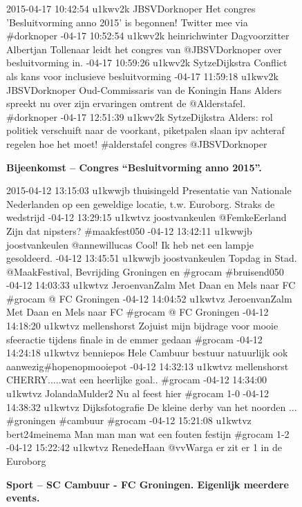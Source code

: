{{\vspace*{-17pt} 
\begin{figure}[H]
 \caption{\bf{Bijeenkomst} – Congres ``Besluitvorming anno 2015''.}
\vspace*{-10pt} 
\begin{framed}
\footnotesize{
2015-04-17 10:42:54 u1kwv2k JBSVDorknoper Het congres 'Besluitvorming anno 2015' is begonnen! Twitter mee via \#dorknoper
-04-17 10:52:54 u1kwv2k heinrichwinter Dagvoorzitter Albertjan Tollenaar leidt het congres van @JBSVDorknoper over besluitvorming in.
-04-17 10:59:26 u1kwv2k SytzeDijkstra Conflict als kans voor inclusieve besluitvorming
-04-17 11:59:18 u1kwv2k JBSVDorknoper Oud-Commissaris van de Koningin Hans Alders spreekt nu over zijn ervaringen omtrent de @Alderstafel. \#dorknoper
-04-17 12:51:39 u1kwv2k SytzeDijkstra Alders: rol politiek verschuift naar de voorkant, piketpalen slaan ipv achteraf regelen hoe het moet! \#alderstafel congres @JBSVDorknoper}
\end{framed}
\end{figure}

\vspace*{-17pt} 
\begin{figure}[H]
 \caption{\bf{Sport} – SC Cambuur - FC Groningen. Eigenlijk meerdere events.}
\vspace*{-10pt} 
\begin{framed}
\footnotesize{
2015-04-12 13:15:03 u1kwwjb thuisingeld Presentatie van Nationale Nederlanden op een geweldige locatie, t.w. Euroborg. Straks de wedstrijd
-04-12 13:29:15 u1kwtvz joostvankeulen @FemkeEerland Zijn dat nipsters? \#maakfest050
-04-12 13:42:11 u1kwwjb joostvankeulen @annewillucas Cool! Ik heb net een lampje gesoldeerd.
-04-12 13:45:51 u1kwwjb joostvankeulen Topdag in Stad. @MaakFestival, Bevrijding Groningen en \#grocam \#bruisend050
-04-12 14:03:33 u1kwtvz JeroenvanZalm Met Daan en Mels naar FC \#grocam @ FC Groningen
-04-12 14:04:52 u1kwtvz JeroenvanZalm Met Daan en Mels naar FC \#grocam @ FC Groningen
-04-12 14:18:20 u1kwtvz mellenshorst Zojuist mijn bijdrage voor mooie sfeeractie tijdens finale in de emmer gedaan \#grocam
-04-12 14:24:18 u1kwtvz benniepos Hele Cambuur bestuur natuurlijk ook aanwezig\#hopenopmooiepot
-04-12 14:32:13 u1kwtvz mellenshorst CHERRY.....wat een heerlijke goal.. \#grocam
-04-12 14:34:00 u1kwtvz JolandaMulder2 Nu al feest hier \#grocam 1-0
-04-12 14:38:32 u1kwtvz Dijksfotografie De kleine derby van het noorden ... \#groningen \#cambuur \#grocam
-04-12 15:21:08 u1kwtvz bert24meinema Man man man wat een fouten festijn \#grocam 1-2
-04-12 15:22:42 u1kwtvz RenedeHaan @vvWarga er zit er 1 in de Euroborg
}
 \end{framed}
\end{figure}

}}
